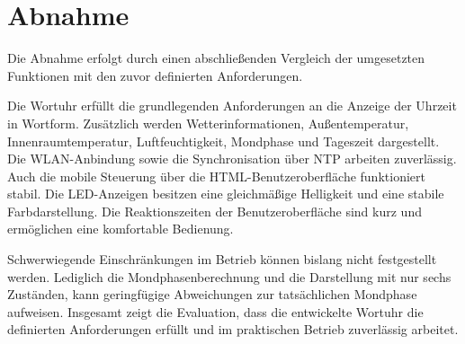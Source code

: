 \section{Abnahme} 
Die Abnahme erfolgt durch einen abschließenden Vergleich der umgesetzten Funktionen mit den zuvor definierten Anforderungen.  

Die Wortuhr erfüllt die grundlegenden Anforderungen an die Anzeige der Uhrzeit in Wortform.  
Zusätzlich werden Wetterinformationen, Außentemperatur, Innenraumtemperatur, Luftfeuchtigkeit, Mondphase und Tageszeit dargestellt.  
Die WLAN-Anbindung sowie die Synchronisation über NTP arbeiten zuverlässig.  
Auch die mobile Steuerung über die HTML-Benutzeroberfläche funktioniert stabil.  
Die LED-Anzeigen besitzen eine gleichmäßige Helligkeit und eine stabile Farbdarstellung.  
Die Reaktionszeiten der Benutzeroberfläche sind kurz und ermöglichen eine komfortable Bedienung.    

Schwerwiegende Einschränkungen im Betrieb können bislang nicht festgestellt werden. 
Lediglich die Mondphasenberechnung und die Darstellung mit nur sechs Zuständen, kann geringfügige Abweichungen zur tatsächlichen Mondphase aufweisen.  
Insgesamt zeigt die Evaluation, dass die entwickelte Wortuhr die definierten Anforderungen erfüllt und im praktischen Betrieb zuverlässig arbeitet.